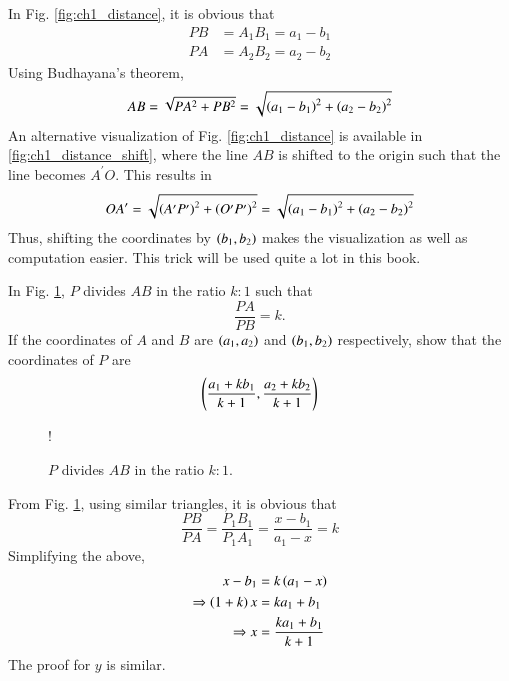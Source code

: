 \renewcommand{\thefigure}{\theproblem}
%
\proof In Fig. \ref{fig:ch1_distance}, it is obvious that 
\begin{align}
PB &=A_1B_1 = a_1-b_1
\\
PA &= A_2B_2 = a_2-b_2 
\end{align}
%
Using Budhayana's theorem, 
%
\begin{equation}
AB = \sqrt{PA^2+PB^2} = \sqrt{\left(a_1 - b_1\right)^2 + \left(a_2 - b_2\right)^2}
\end{equation}
%
An alternative visualization of Fig. \ref{fig:ch1_distance} is available in \ref{fig:ch1_distance_shift}, where the line $AB$ is shifted to the origin such that the line becomes $A^{\prime}O$.  This results in  
\begin{equation}
OA^{\prime} = \sqrt{\left(A^{\prime}P^{\prime}\right)^2 + \left(O^{\prime}P^{\prime}\right)^2} = \sqrt{\left(a_1 - b_1\right)^2 + \left(a_2 - b_2\right)^2}
\end{equation}
%
Thus, shifting the coordinates by $\left(b_1,b_2\right)$ makes the visualization as well as computation easier.  This trick will be used quite a lot in this book.
\begin{problem}
In Fig. \ref{fig:ch1_ratio}, $P$ divides $AB$ in the ratio $k:1$ such that
\begin{equation}
\frac{PA}{PB} = k.
\end{equation}
If the coordinates of $A$ and $B$ are $\left(a_1,a_2\right)$ and
$\left(b_1,b_2\right) $ respectively, show that the coordinates of $P$ are
\begin{equation}
\label{eq:ch1_ratio}
\left(\frac{a_1+kb_1}{k+1},\frac{a_2+kb_2}{k+1}\right)
\end{equation}
\end{problem}
%

\begin{figure}[!h]
\centering
\resizebox {\columnwidth} {!} {

}
\caption{$P$ divides $AB$ in the ratio $k:1$.}
\label{fig:ch1_ratio}
\end{figure}
%
\proof From Fig. \ref{fig:ch1_ratio}, using similar triangles, it is obvious that
%
\begin{equation}
\frac{PB}{PA} = \frac{P_1B_1}{P_1A_1} = \frac{x-b_1}{a_1-x} = k
\end{equation}
%
Simplifying the above, 
%
\begin{align}
x - b_1 &= k\left(a_1-x\right)
\\
\Rightarrow \left(1+k\right)x & = ka_1+b_1
\\
\Rightarrow x &= \frac{ka_1+b_1}{k+1}
\end{align}
%
The proof for $y$ is similar.
%
